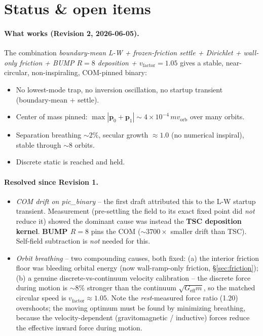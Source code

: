 \documentclass[11pt,a4paper]{article}
\newcommand{\vv}[1]{\mathbf{#1}}
\begin{document}
\section{Status \& open items}
\label{sec:status}

\paragraph{What works (Revision 2, 2026-06-05).}  The combination
\emph{boundary-mean L-W + frozen-friction settle + Dirichlet +
wall-only friction + BUMP $R=8$ deposition + $v_\text{factor}=1.05$}
gives a stable, near-circular, non-inspiraling, COM-pinned binary:
\begin{itemize}[leftmargin=*,nosep]
  \item No lowest-mode trap, no inversion oscillation, no startup
    transient (boundary-mean + settle).
  \item Center of mass pinned: $\max|\vv{p}_0+\vv{p}_1| \sim 4\times
    10^{-4}\,m v_\text{orb}$ over many orbits.
  \item Separation breathing $\sim 2\%$, secular growth $\approx 1.0$
    (no numerical inspiral), stable through $\sim 8$ orbits.
  \item Discrete static is reached and held.
\end{itemize}

\paragraph{Resolved since Revision 1.}
\begin{itemize}[leftmargin=*,nosep]
  \item \emph{COM drift on pic\_binary} -- the first draft attributed
    this to the L-W startup transient.  Measurement (pre-settling the
    field to its exact fixed point did \emph{not} reduce it) showed the
    dominant cause was instead the \textbf{TSC deposition kernel}.
    \textbf{BUMP $R=8$} pins the COM ($\sim 3700\times$ smaller drift
    than TSC).  Self-field subtraction is \emph{not} needed for this.
  \item \emph{Orbit breathing} -- two compounding causes, both fixed:
    (a) the interior friction floor was bleeding orbital energy (now
    wall-ramp-only friction, \S\ref{sec:friction}); (b) a genuine
    discrete-vs-continuum velocity calibration -- the discrete force
    during motion is $\sim 8\%$ stronger than the continuum
    $\sqrt{G_\text{eff} m}$, so the matched circular speed is
    $v_\text{factor} \approx 1.05$.  Note the \emph{rest}-measured force
    ratio (1.20) overshoots; the moving optimum must be found by
    minimizing breathing, because the velocity-dependent
    (gravitomagnetic / inductive) forces reduce the effective inward
    force during motion.
\end{itemize}
\end{document}
